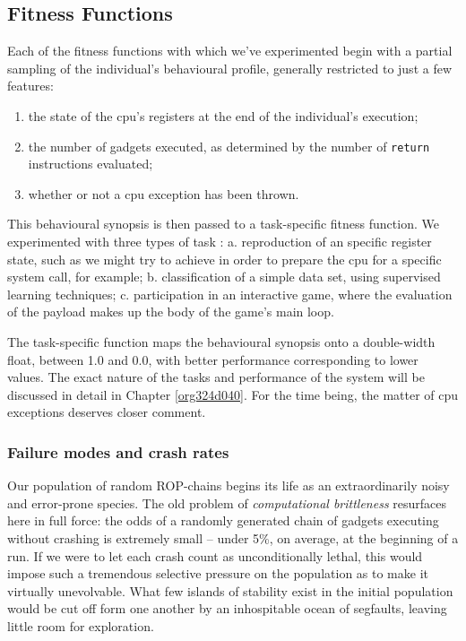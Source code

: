 \documentclass[12pt,glossary]{dalthesis}
\begin{document}
\subsection{Fitness Functions}
\label{sec:org4563f45}
\label{org020be38}

Each of the fitness functions with which we've experimented begin with a partial
sampling of the individual's behavioural profile, generally restricted to just
a few features:
\begin{enumerate}
\item the state of the \gls{cpu}'s registers at the end of the individual's execution;
\item the number of gadgets executed, as determined by the number of \texttt{return}
instructions evaluated;
\item whether or not a \gls{cpu} exception has been thrown.
\end{enumerate}

This behavioural synopsis is then passed to a task-specific fitness function. We
experimented with three types of task : 
  a. reproduction of an specific register state, such as we might try to achieve
     in order to prepare the \gls{cpu} for a specific system call, for example;
  b. classification of a simple data set, using supervised learning techniques;
  c. participation in an interactive game, where the evaluation of the payload
     makes up the body of the game's main loop.

The task-specific function maps the behavioural synopsis onto a double-width float,
between 1.0 and 0.0, with better performance corresponding to lower values. 
The exact nature of the tasks and performance of the system will be discussed in
detail in Chapter \ref{org324d040}. For the time being, the matter of \gls{cpu}
exceptions deserves closer comment.

\subsubsection{Failure modes and crash rates}
\label{sec:orga0dbcee}

Our population of random ROP-chains begins its life as an extraordinarily noisy
and error-prone species. The old problem of \emph{computational brittleness}  resurfaces here in full force: the odds of a
randomly generated chain of gadgets executing without crashing is extremely
small  -- under 5\%, on average, at the
beginning of a run.  If we were to let each crash count as unconditionally
lethal, this would impose such a tremendous selective pressure on the population
as to make it virtually unevolvable. What few islands of stability exist in the
initial population would be cut off form one another by an inhospitable ocean of
segfaults, leaving little room for exploration.
\end{document}
